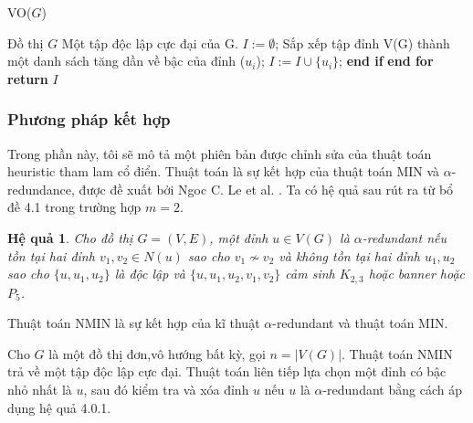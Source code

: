 \documentclass[14pt, oneside, a4paper, openany]{scrartcl}
\newtheorem{corollary}{Hệ quả}[theorem]
\begin{document}
\begin{algorithm}
	\caption{VO($G$)}\label{VO}
	\begin{algorithmic}[1]
		\INPUT Đồ thị $G$
		\OUTPUT Một tập độc lập cực đại của G.
		\State $I := \emptyset$;
		\State Sắp xếp tập đỉnh V(G) thành một danh sách tăng dần về bậc của đỉnh ($u_i$);
				\State $I:= I \cup \{u_i\}$;
			\EndIf
			\State \textbf{end if}					
		\EndFor
		\State \textbf{end for}
		\State \textbf{return} $I$
	\end{algorithmic}
\end{algorithm}


\subsubsection{Phương pháp kết hợp}
Trong phần này, tôi sẽ mô tả một phiên bản được chỉnh sửa của thuật toán heuristic tham lam cổ điển. Thuật toán là sự kết hợp của thuật toán MIN và 
$\alpha$-redundance, được đề xuất bởi Ngoc C. Le et al. \cite{MIS}.
Ta có hệ quả sau rút ra từ bổ đề 4.1 trong trường hợp $m=2$.
\begin{corollary}
	Cho đồ thị $G = (V,E)$, một đỉnh $u \in V(G)$ là $\alpha$-redundant nếu tồn tại hai đỉnh $v_1, v_2 \in N(u)$ sao cho $v_1 \nsim v_2$ và không tồn tại hai đỉnh $u_1, u_2$ sao cho $\{u,u_1,u_2\}$ là độc lập và $\{u,u_1,u_2,v_1,v_2\}$ cảm sinh $K_{2,3}$ hoặc banner hoặc $P_5$.
\end{corollary}

Thuật toán NMIN  là sự kết hợp của kĩ thuật $\alpha$-redundant và thuật toán MIN.

Cho $G$ là một đồ thị đơn,vô hướng bất kỳ, gọi $n = |V(G)|$. Thuật toán NMIN trả về một tập độc lập cực đại. Thuật toán liên tiếp lựa chọn một đỉnh có bậc nhỏ nhất là $u$, sau đó kiểm tra và xóa đỉnh $u$ nếu $u$ là $\alpha$-redundant bằng cách áp dụng hệ quả 4.0.1.
\end{document}
